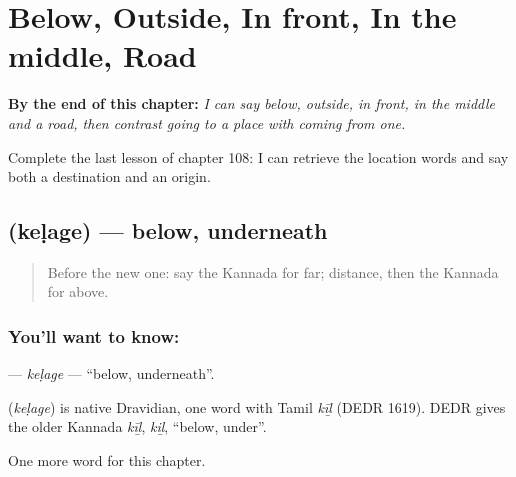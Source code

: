 
\chapter{Below, Outside, In front, In the middle, Road}
\label{ch:ka-below-outside-in-front-in-the-middle-road}

\begin{chapteropening}
\textbf{By the end of this chapter:} \emph{I can say below, outside, in front, in the middle and a road, then contrast going to a place with coming from one.}

Complete the last lesson of chapter 108: I can retrieve the location words and say both a destination and an origin.
\end{chapteropening}

\section[\texorpdfstring{\kn{ಕೆಳಗೆ} (keḷage)}{ಕೆಳಗೆ (keḷage)}]{ (keḷage) — below, underneath}

\label{lesson:KA-C108-kelage}



\begin{quote}
Before the new one: say the Kannada for far; distance, then the Kannada for above.
\end{quote}

\subsection*{You'll want to know: }
\textbf{} — \emph{keḷage} — \textquotedblleft{}below, underneath\textquotedblright{}.

\begin{cousinweb}
\textbf{} (\emph{keḷage}) is native Dravidian, one word with Tamil \emph{kīḻ} (DEDR 1619). DEDR gives the older Kannada \emph{kīḻ}, \emph{kiḻ}, \textquotedblleft{}below, under\textquotedblright{}.
\end{cousinweb}

\begin{grammarlens}[title={What you've built}]
One more word for this chapter.
\end{grammarlens}

